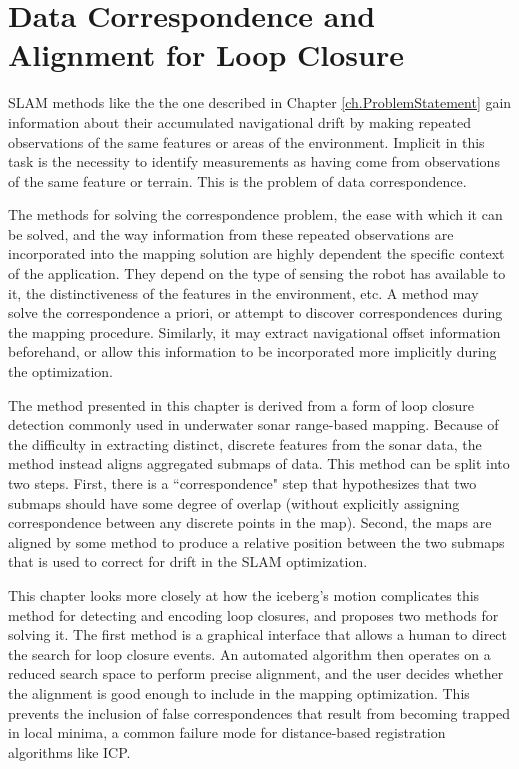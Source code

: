 
\chapter{Data Correspondence and Alignment for Loop Closure}
\label{ch.LoopClosure}

SLAM methods like the the one described in Chapter \ref{ch.ProblemStatement} gain information about their accumulated navigational drift by making repeated observations of the same features or areas of the environment. Implicit in this task is the necessity to identify measurements as having come from observations of the same feature or terrain. This is the problem of data correspondence. 

The methods for solving the correspondence problem, the ease with which it can be solved, and the way information from these repeated observations are incorporated into the mapping solution are highly dependent the specific context of the application. They depend on the type of sensing the robot has available to it, the distinctiveness of the features in the environment, etc. A method may solve the correspondence a priori, or attempt to discover correspondences during the mapping procedure. Similarly, it may extract navigational offset information beforehand, or allow this information to be incorporated more implicitly during the optimization.

The method presented in this chapter is derived from a form of loop closure detection commonly used in underwater sonar range-based mapping. Because of the difficulty in extracting distinct, discrete features from the sonar data, the method instead aligns aggregated submaps of data. This method can be split into two steps. First, there is a ``correspondence" step that hypothesizes that two submaps should have some degree of overlap (without explicitly assigning correspondence between any discrete points in the map). Second, the maps are aligned by some method to produce a relative position between the two submaps that is used to correct for drift in the SLAM optimization. 

This chapter looks more closely at how the iceberg's motion complicates this method for detecting and encoding loop closures, and proposes two methods for solving it. The first method is a graphical interface that allows a human to direct the search for loop closure events. An automated algorithm then operates on a reduced search space to perform precise alignment, and the user decides whether the alignment is good enough to include in the mapping optimization. This prevents the inclusion of false correspondences that result from becoming trapped in local minima, a common failure mode for distance-based registration algorithms like ICP.

